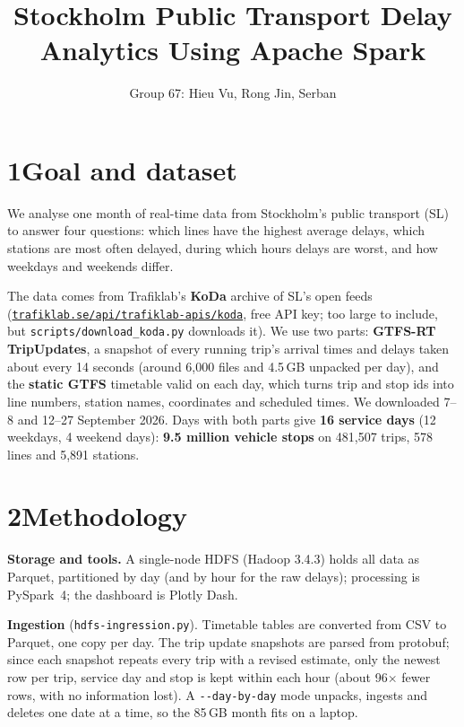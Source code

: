 \documentclass[10pt,a4paper]{article}
\title{\vspace{-0.8cm}\textbf{Stockholm Public Transport Delay Analytics Using Apache Spark}}
\author{Group 67: Hieu Vu, Rong Jin, Serban}
\date{\vspace{-0.9cm}}
\begin{document}
\maketitle
\thispagestyle{empty}

\section*{1\quad Goal and dataset}
We analyse one month of real-time data from Stockholm's public transport (SL) to answer four questions:
which lines have the highest average delays, which stations are most often delayed, during which hours
delays are worst, and how weekdays and weekends differ.

The data comes from Trafiklab's \textbf{KoDa} archive of SL's open feeds
(\href{https://www.trafiklab.se/api/trafiklab-apis/koda/}{\texttt{trafiklab.se/api/trafiklab-apis/koda}}, free API key; too large to include, but
\texttt{scripts/download\_koda.py} downloads it). We use two parts:
\textbf{GTFS-RT TripUpdates}, a snapshot of every running trip's arrival times and delays taken about
every 14 seconds (around 6,000 files and 4.5\,GB unpacked per day), and the \textbf{static GTFS}
timetable valid on each day, which turns trip and stop ids into line numbers, station names, coordinates
and scheduled times. We downloaded 7--8 and 12--27 September 2026. Days with both parts give
\textbf{16 service days} (12 weekdays, 4 weekend days): \textbf{9.5 million vehicle stops} on 481,507
trips, 578 lines and 5,891 stations.

\section*{2\quad Methodology}
\textbf{Storage and tools.} A single-node HDFS (Hadoop 3.4.3) holds all data as Parquet, partitioned by
day (and by hour for the raw delays); processing is PySpark~4; the dashboard is Plotly Dash.

\textbf{Ingestion} (\texttt{hdfs-ingression.py}). Timetable tables are converted from CSV to Parquet,
one copy per day. The trip update snapshots are parsed from protobuf; since each snapshot repeats every
trip with a revised estimate, only the newest row per trip, service day and stop is kept within each hour
(about 96$\times$ fewer rows, with no information lost). A \texttt{-{}-day-by-day} mode unpacks, ingests
and deletes one date at a time, so the 85\,GB month fits on a laptop.
\end{document}
